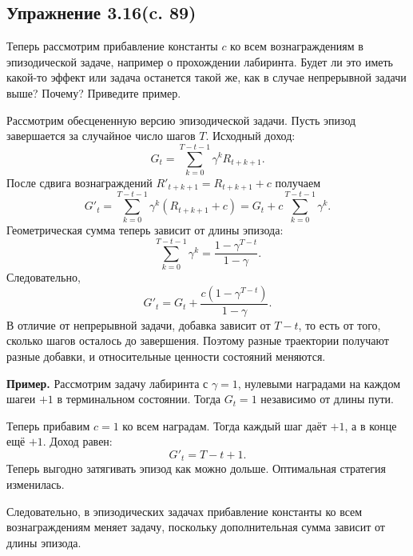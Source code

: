 \subsection{Упражнение 3.16(c. 89)}
Теперь рассмотрим прибавление константы $c$ ко всем вознаграждениям в эпизодической задаче, например о прохождении лабиринта. Будет ли это иметь какой-то эффект или задача останется такой же, как в случае непрерывной задачи выше? Почему? Приведите пример. 
\begin{solution}
Рассмотрим обесцененную версию эпизодической задачи. Пусть эпизод завершается за случайное число шагов $T$.
Исходный доход:
\[
G_t=\sum_{k=0}^{T-t-1}\gamma^k R_{t+k+1}.
\]
После сдвига вознаграждений $R'_{t+k+1}=R_{t+k+1}+c$ получаем
\[
G'_t
=\sum_{k=0}^{T-t-1}\gamma^k (R_{t+k+1}+c)
=G_t + c\sum_{k=0}^{T-t-1}\gamma^k.
\]
Геометрическая сумма теперь зависит от длины эпизода:
\[
\sum_{k=0}^{T-t-1}\gamma^k
=\frac{1-\gamma^{T-t}}{1-\gamma}.
\]
Следовательно,
\[
G'_t
=G_t + \frac{c(1-\gamma^{T-t})}{1-\gamma}.
\]
В отличие от непрерывной задачи, добавка зависит от $T-t$,
то есть от того, сколько шагов осталось до завершения.
Поэтому разные траектории получают разные добавки,
и относительные ценности состояний меняются.

\textbf{Пример.}
Рассмотрим задачу лабиринта с $\gamma=1$, нулевыми наградами на каждом шагеи $+1$ в терминальном состоянии.
Тогда $G_t=1$ независимо от длины пути.

Теперь прибавим $c=1$ ко всем наградам. Тогда каждый шаг даёт $+1$, а в конце ещё $+1$.
Доход равен:
\[
G'_t = T-t+1.
\]
Теперь выгодно затягивать эпизод как можно дольше.
Оптимальная стратегия изменилась.

Следовательно, в эпизодических задачах прибавление константы ко всем вознаграждениям меняет задачу, поскольку дополнительная сумма зависит от длины эпизода.
\end{solution}

